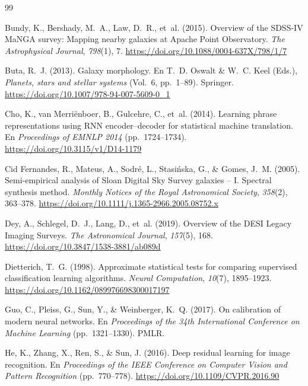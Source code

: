 \renewcommand{\refname}{}
\vspace{-2em}
\begin{thebibliography}{99}
\setlength{\itemsep}{2pt}\small

Bundy, K., Bershady, M.~A., Law, D.~R., et~al. (2015). Overview of the SDSS-IV MaNGA survey: Mapping nearby galaxies at Apache Point Observatory. \emph{The Astrophysical Journal}, \emph{798}(1), 7. \url{https://doi.org/10.1088/0004-637X/798/1/7}

Buta, R.~J. (2013). Galaxy morphology. En T.~D. Oswalt \& W.~C. Keel (Eds.), \emph{Planets, stars and stellar systems} (Vol.~6, pp.~1--89). Springer. \url{https://doi.org/10.1007/978-94-007-5609-0_1}

Cho, K., van Merriënboer, B., Gulcehre, C., et~al. (2014). Learning phrase representations using RNN encoder--decoder for statistical machine translation. En \emph{Proceedings of EMNLP 2014} (pp.~1724--1734). \url{https://doi.org/10.3115/v1/D14-1179}

Cid Fernandes, R., Mateus, A., Sodré, L., Stasińska, G., \& Gomes, J.~M. (2005). Semi-empirical analysis of Sloan Digital Sky Survey galaxies -- I. Spectral synthesis method. \emph{Monthly Notices of the Royal Astronomical Society}, \emph{358}(2), 363--378. \url{https://doi.org/10.1111/j.1365-2966.2005.08752.x}

Dey, A., Schlegel, D.~J., Lang, D., et~al. (2019). Overview of the DESI Legacy Imaging Surveys. \emph{The Astronomical Journal}, \emph{157}(5), 168. \url{https://doi.org/10.3847/1538-3881/ab089d}

Dietterich, T.~G. (1998). Approximate statistical tests for comparing supervised classification learning algorithms. \emph{Neural Computation}, \emph{10}(7), 1895--1923. \url{https://doi.org/10.1162/089976698300017197}

Guo, C., Pleiss, G., Sun, Y., \& Weinberger, K.~Q. (2017). On calibration of modern neural networks. En \emph{Proceedings of the 34th International Conference on Machine Learning} (pp.~1321--1330). PMLR.

He, K., Zhang, X., Ren, S., \& Sun, J. (2016). Deep residual learning for image recognition. En \emph{Proceedings of the IEEE Conference on Computer Vision and Pattern Recognition} (pp.~770--778). \url{https://doi.org/10.1109/CVPR.2016.90}


\end{thebibliography}
